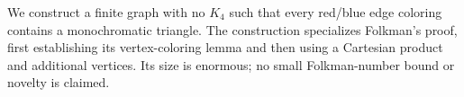 We construct a finite graph with no $K_4$ such that every red/blue edge coloring contains a monochromatic triangle. The construction specializes Folkman's proof, first establishing its vertex-coloring lemma and then using a Cartesian product and additional vertices. Its size is enormous; no small Folkman-number bound or novelty is claimed.

